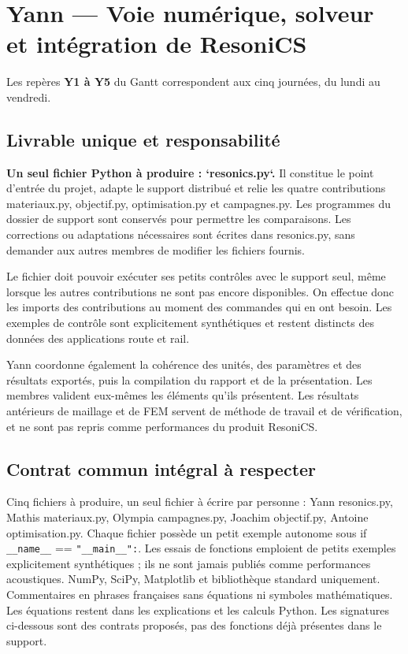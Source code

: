 \documentclass[11pt,a4paper]{article}
\begin{document}
\section{Yann — Voie numérique, solveur et intégration de ResoniCS}

Les repères \textbf{Y1 à Y5} du Gantt correspondent aux cinq journées, du lundi au vendredi.

\subsection{Livrable unique et responsabilité}

\textbf{Un seul fichier Python à produire : `resonics.py`.} Il constitue le point d'entrée du projet, adapte le support distribué et relie les quatre contributions {\small\ttfamily materiaux.py}, {\small\ttfamily objectif.py}, {\small\ttfamily optimisation.py} et {\small\ttfamily campagnes.py}. Les programmes du dossier de support sont conservés pour permettre les comparaisons. Les corrections ou adaptations nécessaires sont écrites dans {\small\ttfamily resonics.py}, sans demander aux autres membres de modifier les fichiers fournis.

Le fichier doit pouvoir exécuter ses petits contrôles avec le support seul, même lorsque les autres contributions ne sont pas encore disponibles. On effectue donc les imports des contributions au moment des commandes qui en ont besoin. Les exemples de contrôle sont explicitement synthétiques et restent distincts des données des applications route et rail.

Yann coordonne également la cohérence des unités, des paramètres et des résultats exportés, puis la compilation du rapport et de la présentation. Les membres valident eux-mêmes les éléments qu'ils présentent. Les résultats antérieurs de maillage et de FEM servent de méthode de travail et de vérification, et ne sont pas repris comme performances du produit ResoniCS.


\subsection{Contrat commun intégral à respecter}

Cinq fichiers à produire, un seul fichier à écrire par personne : Yann {\small\ttfamily resonics.py}, Mathis {\small\ttfamily materiaux.py}, Olympia {\small\ttfamily campagnes.py}, Joachim {\small\ttfamily objectif.py}, Antoine {\small\ttfamily optimisation.py}. Chaque fichier possède un petit exemple autonome sous {\small\ttfamily if \nolinkurl{__name__} == \nolinkurl{"__main__":}}. Les essais de fonctions emploient de petits exemples explicitement synthétiques ; ils ne sont jamais publiés comme performances acoustiques. NumPy, SciPy, Matplotlib et bibliothèque standard uniquement. Commentaires en phrases françaises sans équations ni symboles mathématiques. Les équations restent dans les explications et les calculs Python. Les signatures ci-dessous sont des contrats proposés, pas des fonctions déjà présentes dans le support.
\end{document}
